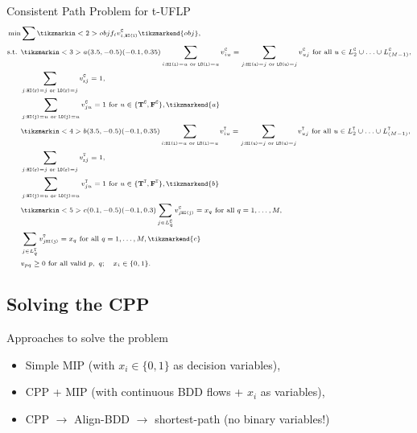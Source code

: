 \documentclass[10pt, xcolor=svgnames]{beamer}
\begin{document}
\begin{frame}[label={sec:org4721e2e}]{Consistent Path Problem for t-UFLP}
\begin{subequations}
\scriptsize
  \begin{align*}
    \min & \sum \tikzmarkin<2>{obj}f_i v^{\cov}_{i,\hi{i}}\tikzmarkend{obj},\\
    \textrm{s.t. } & \tikzmarkin<3>{a}(3.5,-0.5)(-0.1,0.35)\sum_{i:\hi{i}=u\textrm{ or }\lo{i}=u}v^{\cov}_{iu} = \sum_{j:\hi{u}=j\textrm{ or } \lo{u}=j}v^{\cov}_{uj} \textrm{ for all } u\in L_2^{\cov}\cup\ldots\cup L_{(M-1)}^{\cov},\\
         & \sum_{j:\hi{\ROOT}=j\textrm{ or } \lo{\ROOT}=j}v^{\cov}_{\ROOT{}j} = 1,\\
         & \sum_{j:\hi{j}=u\textrm{ or } \lo{j}=u}v^{\cov}_{ju} = 1 \textrm{ for } u\in \{\T^{\cov},\F^{\cov}\},\tikzmarkend{a}\\
         & \tikzmarkin<4>{b}(3.5,-0.5)(-0.1,0.35)\sum_{i:\hi{i}=u\textrm{ or }\lo{i}=u}v^{\type}_{iu} = \sum_{j:\hi{u}=j\textrm{ or } \lo{u}=j}v^{\type}_{uj} \textrm{ for all } u\in L_2^{\type}\cup\ldots\cup L_{(M-1)}^{\type},\\
         & \sum_{j:\hi{\ROOT}=j\textrm{ or } \lo{\ROOT}=j}v^{\type}_{\ROOT{}j} = 1,\\
         & \sum_{j:\hi{j}=u\textrm{ or } \lo{j}=u}v^{\type}_{ju} = 1 \textrm{ for } u\in \{\T^{\type},\F^{\type}\},\tikzmarkend{b}\\
         &\tikzmarkin<5>{c}(0.1,-0.5)(-0.1,0.3) \sum_{j\in L^{\cov}_q} v^{\cov}_{j\hi{j}} = x_q \textrm{ for all } q=1,\ldots,M,\\
         & \sum_{j\in L^{\type}_q} v^{\type}_{j\hi{j}} = x_q \textrm{ for all } q=1,\ldots,M,\tikzmarkend{c}\\
         & v_{pq}\geq 0 \textrm{ for all valid } p,~q;\quad x_i\in\{0,1\}.
  \end{align*}
\end{subequations}
\end{frame}

\subsection{Solving the CPP}
\label{sec:org850f728}
\begin{frame}[label={sec:orgc7863ad}]{Approaches to solve the problem}
\begin{itemize}
\item Simple MIP (with \(x_i\in\{0,1\}\) as decision variables),
\item CPP + MIP (with continuous BDD flows + \(x_i\) as variables),
\item CPP \(\rightarrow\) Align-BDD \(\rightarrow\) shortest-path (no binary variables!)
\end{itemize}
\end{frame}
\end{document}

